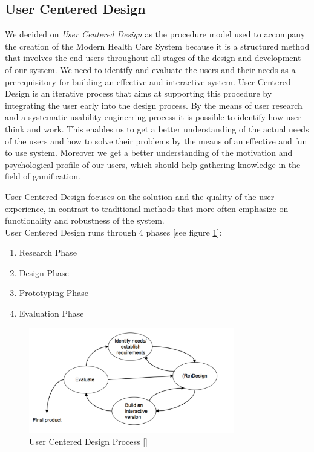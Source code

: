 \documentclass[a4paper,11pt]{article}
\begin{document}
\subsection{User Centered Design}
\label{subsect:ucd}
We decided on \emph{User Centered Design} as the procedure model used to accompany the creation of the Modern Health Care System because it is a structured method that involves the end users throughout all stages of the design and development of our system. We need to identify and evaluate the users and their needs as a prerequisitory for building an effective and interactive system. User Centered Design is an iterative process that aims at supporting this procedure by integrating the user early into the design process. By the means of user research and a systematic usability enginerring process it is possible to identify how user think and work. This enables us to get a better understanding of the actual needs of the users and how to solve their problems by the means of an effective and fun to use system. Moreover we get a better understanding of the motivation and psychological profile of our users, which should help gathering knowledge in the field of gamification.

User Centered Design focuses on the solution and the quality of the user experience, in contrast to traditional methods that more often emphasize on functionality and robustness of the system. \\

User Centered Design runs through 4 phases [see figure \ref{fig:UCD}]:

\begin{enumerate}
	\item Research Phase
	\item Design Phase
	\item Prototyping Phase
	\item Evaluation Phase
\end{enumerate}

\begin{figure}[htb]
	\centering
		\includegraphics[width=0.8\textwidth]{images/method/UCD.pdf}
	\caption{User Centered Design Process [\cite{usability11}]}
	\label{fig:UCD}
\end{figure}
\end{document}
